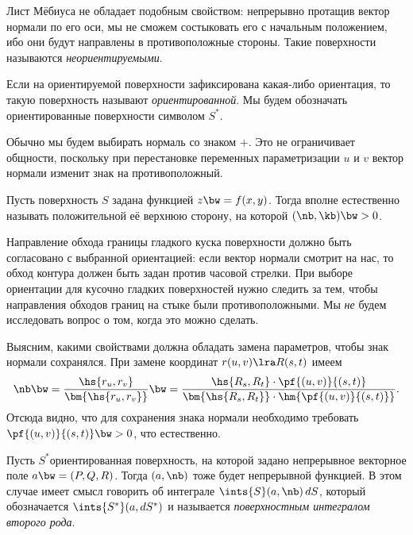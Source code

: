 \documentclass[a4paper]{article}
\begin{document}
\begin{ex}
Лист Мёбиуса не обладает подобным свойством: непрерывно протащив вектор нормали по его оси, мы не
сможем состыковать его с начальным положением, ибо они будут направлены в противоположные стороны.
Такие поверхности называются \emph{неориентируемыми}.
\end{ex}

\begin{df}
Если на ориентируемой поверхности зафиксирована какая-либо ориентация, то такую поверхность
называют \emph{ориентированной}. Мы будем обозначать ориентированные поверхности символом $S^*$.
\end{df}

Обычно мы будем выбирать нормаль со знаком $+$. Это не ограничивает общности, поскольку при перестановке
переменных параметризации $u$ и $v$ вектор нормали изменит знак на противоположный.

\begin{ex}
Пусть поверхность $S$ задана функцией $z \bw= f(x,y)$. Тогда вполне естественно называть положительной её
верхнюю сторону, на которой $(\nb, \kb) \bw> 0$.
\end{ex}

Направление обхода границы гладкого куска поверхности должно быть согласовано с выбранной ориентацией:
если вектор нормали смотрит на нас, то обход контура должен быть задан против часовой стрелки. При
выборе ориентации для кусочно гладких поверхностей нужно следить за тем, чтобы направления обходов границ
на стыке были противоположными. Мы \emph{не} будем исследовать вопрос о том, когда это можно сделать.

Выясним, какими свойствами должна обладать замена параметров, чтобы знак нормали сохранялся. При
замене координат $r(u,v) \lra R(s,t)$ имеем
$$
  \nb \bw= \frac{\hs{r_u, r_v}}{\bm{\hs{r_u, r_v}}} \bw=
  \frac{\hs{R_s, R_t}\cdot \pf{(u,v)}{(s,t)}}{\bm{\hs{R_s, R_t}}\cdot \hm{\pf{(u,v)}{(s,t)}}}.
$$
Отсюда видно, что для сохранения знака нормали необходимо требовать $\pf{(u,v)}{(s,t)} \bw> 0$, что естественно.

\begin{df}
Пусть $S^*$\т ориентированная поверхность, на которой задано непрерывное векторное поле $a \bw= (P, Q, R)$.
Тогда $(a, \nb)$ тоже будет непрерывной функцией. В этом случае имеет смысл говорить об интеграле
$\ints{S}(a, \nb)\,d S$, который обозначается $\ints{S^*}(a, d S^*)$ и называется \emph{поверхностным
интегралом второго рода}.
\end{df}
\end{document}
